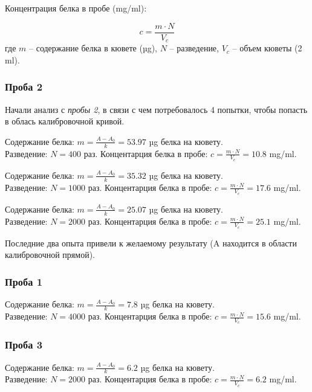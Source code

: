 Концентрация белка в пробе (mg/ml):

$$ c = \frac{m \cdot N}{V_c} $$
где $m$ -- содержание белка в кювете (µg),
$N$ -- разведение,
$V_c$ -- объем кюветы (2 ml).

\subsubsection{Проба 2}
Начали анализ с \emph{пробы 2}, в связи с чем потребовалось 4 попытки,
чтобы попасть в облась калибровочной кривой.

\def\svgwidth{\linewidth}

\def\svgwidth{\linewidth}
Содержание белка: $ m = \frac{A-A_0}{k} = 53.97 $ µg белка на кювету. \\
Разведение: $ N = 400 $ раз.
Концентарция белка в пробе: $ c = \frac{m \cdot N}{V_c} = 10.8 $ mg/ml.

\def\svgwidth{\linewidth}
Содержание белка: $ m = \frac{A-A_0}{k} = 35.32 $ µg белка на кювету. \\
Разведение: $ N = 1000 $ раз.
Концентарция белка в пробе: $ c = \frac{m \cdot N}{V_c} = 17.6 $ mg/ml.

\def\svgwidth{\linewidth}
Содержание белка: $ m = \frac{A-A_0}{k} = 25.07 $ µg белка на кювету. \\
Разведение: $ N = 2000 $ раз.
Концентарция белка в пробе: $ c = \frac{m \cdot N}{V_c} = 25.1 $ mg/ml.

Последние два опыта привели к желаемому результату
(A находится в области калибровочной прямой).

\subsubsection{Проба 1}
\def\svgwidth{\linewidth}
Содержание белка: $ m = \frac{A-A_0}{k} = 7.8 $ µg белка на кювету. \\
Разведение: $ N = 4000 $ раз.
Концентарция белка в пробе: $ c = \frac{m \cdot N}{V_c} = 15.6 $ mg/ml.

\subsubsection{Проба 3}
\def\svgwidth{\linewidth}
Содержание белка: $ m = \frac{A-A_0}{k} = 6.2 $ µg белка на кювету. \\
Разведение: $ N = 2000 $ раз.
Концентарция белка в пробе: $ c = \frac{m \cdot N}{V_c} = 6.2 $ mg/ml.

